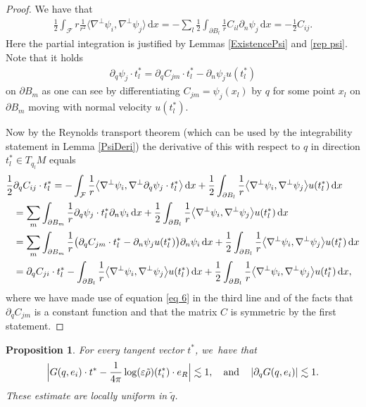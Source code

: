 \documentclass[10pt]{amsart}
\let\epsilon\varepsilon
\newtheorem{proposition}[theorem]{Proposition}
\theoremstyle{definition}
\newcommand\bscalar[2]{\bigl\langle #1,#2\bigr\rangle}
\newcommand\eq{=}
\newcommand\dd{\,\mathrm{d}}
\newcommand\dx{\dd x}
\let\de\partial
\let\eps\epsilon
\let\mel\relax
\begin{document}
\begin{proof}
We have that
\begin{align*}
\frac{1}{2}\int_\mathcal{F} r\frac{1}{r^2}\bscalar{\nabla^\perp\psi_i}{\nabla^\perp\psi_j}\dx\eq-\sum_l\frac{1}{2}\int_{\de B_l}\frac{1}{r}C_{il}\de_n\psi_j\dx\eq-\frac{1}{2}C_{ij}.
\end{align*}
Here the partial integration is justified by Lemmas \ref{ExistencePsi} and \ref{rep psi}.
Note that it holds
\begin{align}\label{eq 6}
\de_q\psi_j\cdot t_l^*\eq\de_q C_{jm}\cdot t_l^*-\de_n\psi_j u(t_l^*)
\end{align}
on $\de B_m$ as one can see by differentiating $C_{jm}=\psi_j(x_l)$ by $q$ for some point $x_l$ on $\de B_m$ moving with normal velocity $u(t_l^*)$.

Now by the Reynolds transport theorem (which can be used by the integrability statement in Lemma \ref{PsiDeri}) the derivative of this with respect to $q$ in direction $t_l^*\in T_{q_l}M$ equals
\begin{align*}
\mel\frac{1}{2}&\de_q C_{ij}\cdot t_l^*\eq -\int_\mathcal{F} \frac{1}{r}\bscalar{\nabla^\perp\psi_i}{\nabla^\perp\de_q\psi_j\cdot t_l^*}\dx+\frac{1}{2}\int_{\de B_l}\frac{1}{r}\bscalar{\nabla^\perp\psi_i}{\nabla^\perp\psi_j}u(t_l^*)\dx\\
&\eq\sum_{m}\int_{\de B_m}\frac{1}{r}\de_q\psi_j\cdot t_l^*\de_n\psi_i\dx+\frac{1}{2}\int_{\de B_l}\frac{1}{r}\bscalar{\nabla^\perp\psi_i}{\nabla^\perp\psi_j}u(t_l^*)\dx\\
&\eq\sum_m\int_{\de B_m}\frac{1}{r}\bigl(\de_q C_{jm}\cdot t_l^*-\de_n\psi_j u(t_l^*)\bigr)\de_n\psi_i\dx+\frac{1}{2}\int_{\de B_l}\frac{1}{r}\bscalar{\nabla^\perp\psi_i}{\nabla^\perp\psi_j}u(t_l^*)\dx\\
&\eq\de_qC_{ji}\cdot t_l^*-\int_{\de B_l}\frac{1}{r}\bscalar{\nabla^\perp\psi_i}{\nabla^\perp\psi_j} u(t_l^*)\dx+\frac{1}{2}\int_{\de B_l}\frac{1}{r}\bscalar{\nabla^\perp\psi_i}{\nabla^\perp\psi_j}u(t_l^*)\dx,
\end{align*}
where we have made use of equation \eqref{eq 6} in the third line and of the facts that $\de_q C_{jm}$ is a constant function and that the matrix $C$ is symmetric by the first statement.
\end{proof}

\begin{proposition}\label{diagonal A}
For every tangent vector $t^*$, we~have that
\[
\Bigl|G(q,e_i)\cdot t^*-\frac{1}{4\pi}\log(\eps\tilde{\rho})(t_i^*)\cdot e_R\Bigr|\lesssim 1,
\quad
\text{and}\quad
\left|\de_qG(q,e_i)\right|\lesssim 1.
\]
These estimate are locally uniform in $\tilde{q}$.
\end{proposition}
\end{document}
